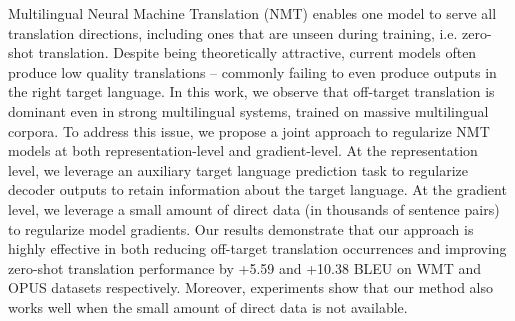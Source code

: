 Multilingual Neural Machine Translation (NMT) enables one model to serve all translation directions, including ones that are unseen during training, i.e. zero-shot translation. Despite being theoretically attractive, current models often produce low quality translations -- commonly failing to even produce outputs in the right target language. In this work, we observe that off-target translation is dominant even in strong multilingual systems, trained on massive multilingual corpora. To address this issue, we propose a joint approach to regularize NMT models at both representation-level and gradient-level. At the representation level, we leverage an auxiliary target language prediction task to regularize decoder outputs to retain information about the target language. At the gradient level, we leverage a small amount of direct data (in thousands of sentence pairs) to regularize model gradients. Our results demonstrate that our approach is highly effective in both reducing off-target translation occurrences and improving zero-shot translation performance by +5.59 and +10.38 BLEU on WMT and OPUS datasets respectively. Moreover, experiments show that our method also works well when the small amount of direct data is not available.
